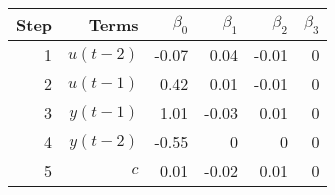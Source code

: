 \begin{tabular}{rrrrrr}
Step & Terms & $\beta_{0}$ & $\beta_{1}$ & $\beta_{2}$ & $\beta_{3}$ \\ 
\hline 
1 & $u(t-2)$ & -0.07 & 0.04 & -0.01 & 0 \\ 
2 & $u(t-1)$ & 0.42 & 0.01 & -0.01 & 0 \\ 
3 & $y(t-1)$ & 1.01 & -0.03 & 0.01 & 0 \\ 
4 & $y(t-2)$ & -0.55 & 0 & 0 & 0 \\ 
5 & $c$ & 0.01 & -0.02 & 0.01 & 0 \\ 
\hline 
\end{tabular}